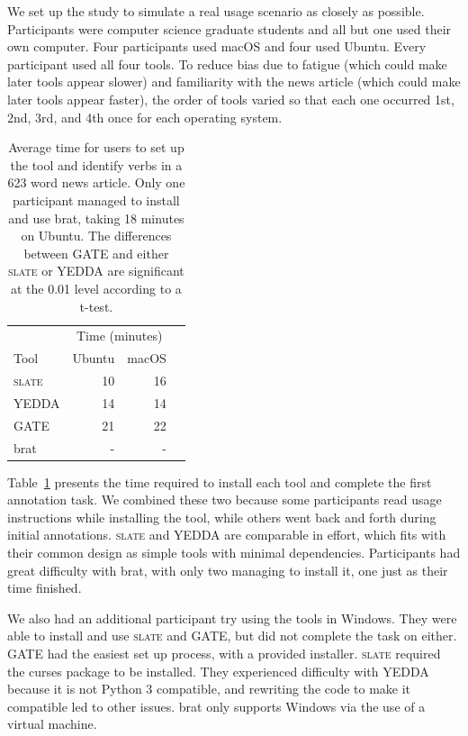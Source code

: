 \documentclass[11pt,a4paper]{article}
\newcommand\slate{\textsc{slate}\xspace}
\begin{document}
We set up the study to simulate a real usage scenario as closely as possible.
Participants were computer science graduate students and all but one used their own computer.
Four participants used macOS and four used Ubuntu.
Every participant used all four tools.
To reduce bias due to fatigue (which could make later tools appear slower) and familiarity with the news article (which could make later tools appear faster), the order of tools varied so that each one occurred 1st, 2nd, 3rd, and 4th once for each operating system.

\begin{table}
  \centering
  \small
  \begin{tabular}{lrrr}
    \toprule
           & \multicolumn{2}{c}{Time (minutes)} \\
    Tool   & Ubuntu & macOS \\
    \midrule
    \slate & 10 & 16 \\
    YEDDA  & 14 & 14 \\
    GATE   & 21 & 22 \\
    brat   &  - &  - \\
    \bottomrule
  \end{tabular}
  \caption{\label{tab:study}
  Average time for users to set up the tool and identify verbs in a 623 word news article.
  Only one participant managed to install and use brat, taking 18 minutes on Ubuntu.
  The differences between GATE and either \slate or YEDDA are significant at the 0.01 level according to a t-test.
  }
\end{table}

Table~\ref{tab:study} presents the time required to install each tool and complete the first annotation task.
We combined these two because some participants read usage instructions while installing the tool, while others went back and forth during initial annotations.
\slate and YEDDA are comparable in effort, which fits with their common design as simple tools with minimal dependencies.
Participants had great difficulty with brat, with only two managing to install it, one just as their time finished.

We also had an additional participant try using the tools in Windows.
They were able to install and use \slate and GATE, but did not complete the task on either.
GATE had the easiest set up process, with a provided installer.
\slate required the curses package to be installed.
They experienced difficulty with YEDDA because it is not Python 3 compatible, and rewriting the code to make it compatible led to other issues.
brat only supports Windows via the use of a virtual machine.
\end{document}
